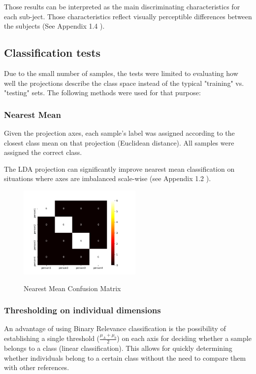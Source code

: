 \documentclass{bmvc2k}
\begin{document}
Those results can be interpreted as the main discriminating characteristics for each sub-ject\cite{statanalysis}. Those characteristics reflect visually perceptible differences between the subjects (See Appendix 1.4 \cite{appendix}).

\subsection{Classification tests}

Due to the small number of samples, the tests were limited to evaluating how well the projections describe the class space instead of the typical "training" vs. "testing" sets. 
The following methods were used for that purpose:

\subsubsection{Nearest Mean}

Given the projection axes, each sample's label was assigned according to the closest class mean on that projection (Euclidean distance). All samples were assigned the correct class.

The LDA projection can significantly improve nearest mean classification on situations where axes are imbalanced scale-wise\cite{statanalysis} (see Appendix 1.2 \cite{appendix}).

\begin{figure}[H]
   \begin{center}
      \label{m1}
      \includegraphics[width=6cm]{figures/ConfusionMatrixNearestMean.png}
   \end{center}
   \caption{Nearest Mean Confusion Matrix}
\end{figure}

\subsubsection{Thresholding on individual dimensions}

An advantage of using Binary Relevance classification is the possibility of establishing a single threshold ($\frac{\mu_A+\mu_b}{2}$) on each axis for deciding whether a sample belongs to a class (linear classification)\cite{binary}. This allows for quickly determining whether individuals belong to a certain class without the need to compare them with other references.
\end{document}
